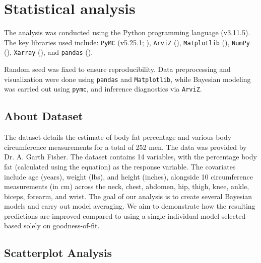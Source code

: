 \documentclass[12 pt]{scrartcl}
\begin{document}
	\section{Statistical analysis}

	The analysis was conducted using the Python programming language (v3.11.5). The key libraries used include: 
	\texttt{PyMC} (v5.25.1; \cite{pymc}), 
	\texttt{ArviZ} (\cite{arviz}), 
	\texttt{Matplotlib} (\cite{matplotlib}), 
	\texttt{NumPy} (\cite{numpy}), 
	\texttt{Xarray} (\cite{xarray}), 
	and \texttt{pandas} (\cite{pandas}).
	
	Random seed was fixed to ensure reproducibility. Data preprocessing and visualization were done using \texttt{pandas} and \texttt{Matplotlib}, while Bayesian modeling was carried out using \texttt{pymc}, and inference diagnostics via \texttt{ArviZ}.
	
	
	\subsection{About Dataset}
	The dataset \cite{soriano2017body} details the estimate of body fat percentage and various body circumference measurements for a total of 252 men. The data was provided by Dr. A. Garth Fisher. The dataset contains 14 variables, with the percentage body fat (calculated using the \cite{siri1956gross} equation) as the response variable. The covariates include age (years), weight (lbs), and height (inches), alongside 10 circumference measurements (in cm) across the neck, chest, abdomen, hip, thigh, knee, ankle, biceps, forearm, and wrist. The goal of our analysis is to create several Bayesian models and carry out model averaging. We aim to demonstrate how the resulting predictions are improved compared to using a single individual model selected based solely on goodness-of-fit.
	
	
	\subsection{Scatterplot Analysis}
	
\end{document}
